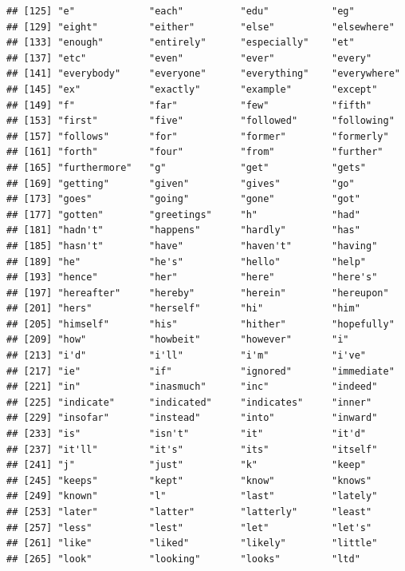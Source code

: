 \documentclass[]{book}
\begin{document}
\begin{verbatim}
## [125] "e"             "each"          "edu"           "eg"           
## [129] "eight"         "either"        "else"          "elsewhere"    
## [133] "enough"        "entirely"      "especially"    "et"           
## [137] "etc"           "even"          "ever"          "every"        
## [141] "everybody"     "everyone"      "everything"    "everywhere"   
## [145] "ex"            "exactly"       "example"       "except"       
## [149] "f"             "far"           "few"           "fifth"        
## [153] "first"         "five"          "followed"      "following"    
## [157] "follows"       "for"           "former"        "formerly"     
## [161] "forth"         "four"          "from"          "further"      
## [165] "furthermore"   "g"             "get"           "gets"         
## [169] "getting"       "given"         "gives"         "go"           
## [173] "goes"          "going"         "gone"          "got"          
## [177] "gotten"        "greetings"     "h"             "had"          
## [181] "hadn't"        "happens"       "hardly"        "has"          
## [185] "hasn't"        "have"          "haven't"       "having"       
## [189] "he"            "he's"          "hello"         "help"         
## [193] "hence"         "her"           "here"          "here's"       
## [197] "hereafter"     "hereby"        "herein"        "hereupon"     
## [201] "hers"          "herself"       "hi"            "him"          
## [205] "himself"       "his"           "hither"        "hopefully"    
## [209] "how"           "howbeit"       "however"       "i"            
## [213] "i'd"           "i'll"          "i'm"           "i've"         
## [217] "ie"            "if"            "ignored"       "immediate"    
## [221] "in"            "inasmuch"      "inc"           "indeed"       
## [225] "indicate"      "indicated"     "indicates"     "inner"        
## [229] "insofar"       "instead"       "into"          "inward"       
## [233] "is"            "isn't"         "it"            "it'd"         
## [237] "it'll"         "it's"          "its"           "itself"       
## [241] "j"             "just"          "k"             "keep"         
## [245] "keeps"         "kept"          "know"          "knows"        
## [249] "known"         "l"             "last"          "lately"       
## [253] "later"         "latter"        "latterly"      "least"        
## [257] "less"          "lest"          "let"           "let's"        
## [261] "like"          "liked"         "likely"        "little"       
## [265] "look"          "looking"       "looks"         "ltd"          

\end{verbatim}
\end{document}
